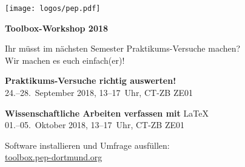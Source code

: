 \documentclass[paper=landscape]{scrartcl}
\begin{document}
  
  \begin{minipage}{0.25\textwidth}%
    \texttt{[image: logos/pep.pdf]}%
  \end{minipage}%
  \begin{minipage}{0.75\textwidth}%
    \centering\fontsize{50}{60}\bfseries\selectfont Toolbox-Workshop 2018%
  \end{minipage}%

  \vspace{0.5cm}

  \begin{center}
    \Huge Ihr müsst im nächsten Semester Praktikums-Versuche machen? \\[0.5\baselineskip]
    Wir machen es euch einfach(er)!
  \end{center}
  
  \vspace{0.5cm}

  \begin{center}
    \huge \textbf{Praktikums-Versuche richtig auswerten!} \\[0.5\baselineskip]
    24.–28.~September 2018, 13–17~Uhr, CT-ZB ZE01
  \end{center}
  \vspace{0.5cm}
  \begin{center}
    \huge \textbf{Wissenschaftliche Arbeiten verfassen mit} \textrm{\LaTeX}\\[0.5\baselineskip]
    01.–05.~Oktober 2018, 13–17~Uhr, CT-ZB ZE01
  \end{center}
  \vspace{0.5cm}
  \begin{center}
    \large Software installieren und Umfrage ausfüllen: \\
    \Huge \href{https://toolbox.pep-dortmund.org}{toolbox.pep-dortmund.org}
  \end{center}

\end{document}
